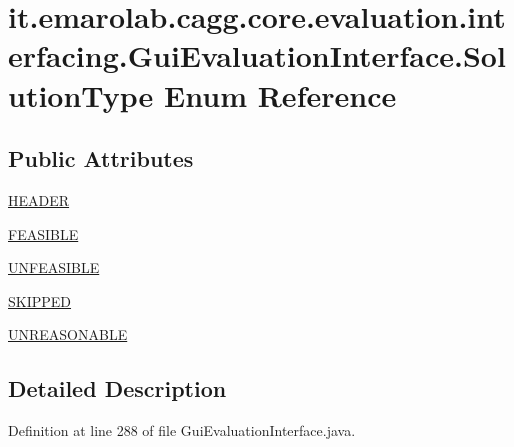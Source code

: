 \hypertarget{enumit_1_1emarolab_1_1cagg_1_1core_1_1evaluation_1_1interfacing_1_1GuiEvaluationInterface_1_1SolutionType}{\section{it.\-emarolab.\-cagg.\-core.\-evaluation.\-interfacing.\-Gui\-Evaluation\-Interface.\-Solution\-Type Enum Reference}
\label{enumit_1_1emarolab_1_1cagg_1_1core_1_1evaluation_1_1interfacing_1_1GuiEvaluationInterface_1_1SolutionType}
}
\subsection*{Public Attributes}
\begin{DoxyCompactItemize}
\item 
\hyperlink{enumit_1_1emarolab_1_1cagg_1_1core_1_1evaluation_1_1interfacing_1_1GuiEvaluationInterface_1_1SolutionType_a1e187a8186221804c0e0559b343900c2}{H\-E\-A\-D\-E\-R}
\item 
\hyperlink{enumit_1_1emarolab_1_1cagg_1_1core_1_1evaluation_1_1interfacing_1_1GuiEvaluationInterface_1_1SolutionType_a9f70b219bfc0b92170282eca3ca51e91}{F\-E\-A\-S\-I\-B\-L\-E}
\item 
\hyperlink{enumit_1_1emarolab_1_1cagg_1_1core_1_1evaluation_1_1interfacing_1_1GuiEvaluationInterface_1_1SolutionType_a892aef23e61f9f8303e0ebee2fc1d251}{U\-N\-F\-E\-A\-S\-I\-B\-L\-E}
\item 
\hyperlink{enumit_1_1emarolab_1_1cagg_1_1core_1_1evaluation_1_1interfacing_1_1GuiEvaluationInterface_1_1SolutionType_acff2414860520601a555d38a66b39836}{S\-K\-I\-P\-P\-E\-D}
\item 
\hyperlink{enumit_1_1emarolab_1_1cagg_1_1core_1_1evaluation_1_1interfacing_1_1GuiEvaluationInterface_1_1SolutionType_ad23e4cb910c59194130652250407ae0b}{U\-N\-R\-E\-A\-S\-O\-N\-A\-B\-L\-E}
\end{DoxyCompactItemize}


\subsection{Detailed Description}


Definition at line 288 of file Gui\-Evaluation\-Interface.\-java.



